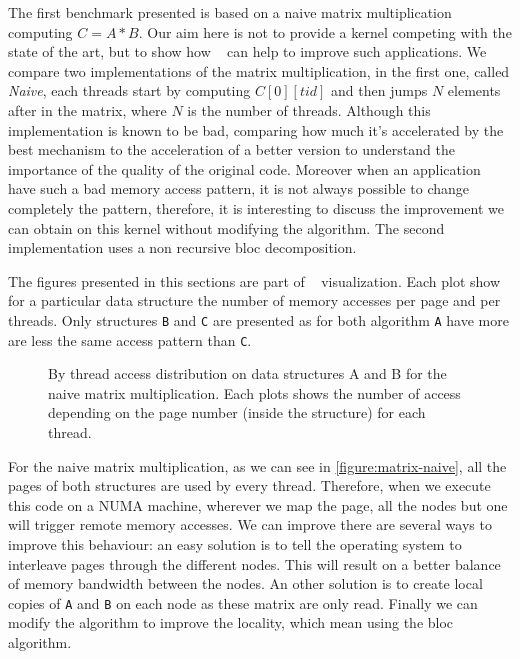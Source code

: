 The first benchmark presented is based on a naive matrix multiplication
computing $C=A*B$. Our aim here is not to provide a kernel competing with the
state of the art, but to show how \TABARNAC~ can help to improve such
applications. We compare two implementations of the matrix multiplication, in
the first one, called \emph{Naive}, each threads start by computing
$C[0][tid]$ and then jumps $N$ elements after in the matrix, where $N$ is the
number of threads. Although this implementation is known to be bad, comparing
how much it's accelerated by the best mechanism to the acceleration of a
better version to understand the importance of the quality of the original
code. Moreover when an application have such a bad memory access pattern, it
is not always possible to change completely the pattern, therefore, it is
interesting to discuss the improvement we can obtain on this kernel without
modifying the algorithm. The second implementation uses a non recursive bloc
decomposition.

The figures presented in this sections are part of \TABARNAC~ visualization.
Each plot show for a particular data structure the number of memory accesses
per page and per threads. Only structures \texttt{B} and \texttt{C} are
presented as for both algorithm \texttt{A} have more are less the same access
pattern than \texttt{C}.

\begin{figure}[htb]
    \centering
    \caption{By thread access distribution on data structures A and B for the
        naive matrix multiplication. Each plots shows the number of access
    depending on the page number (inside the structure) for each thread.}
    \label{fig:matrix-naive}
\end{figure}

For the naive matrix multiplication, as we can see in
\ref{figure:matrix-naive}, all the pages of both structures are used by every
thread. Therefore, when we execute this code on a NUMA machine, wherever we
map the page, all the nodes but one will trigger remote memory accesses. We
can improve there are several ways to improve this behaviour: an easy solution
is to tell the operating system to interleave pages through the different
nodes. This will result on a better balance of memory bandwidth between the
nodes. An other solution is to create local copies of \texttt{A} and
\texttt{B} on each node as these matrix are only read. Finally we can modify
the algorithm to improve the locality, which mean using the bloc algorithm.

